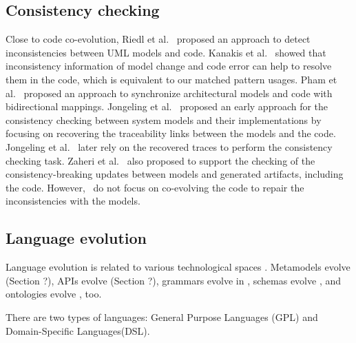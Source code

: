  \subsection{Consistency checking }
 \label{Consistency_checking}
  Close to code co-evolution, Riedl et al.~\cite{riedl2014towards} proposed an approach to detect inconsistencies between UML models and code. Kanakis et al.~\cite{kanakis2019empirical} showed that inconsistency information of model change and code error can help to resolve them in the code, which is equivalent to our matched pattern usages. 
 Pham et al.~\cite{pham2017bidirectional} proposed an approach to synchronize architectural models and code with bidirectional mappings.
 Jongeling et al.~\cite{jongeling2020towards} proposed an early approach for the consistency checking between system models and their implementations by focusing on recovering the traceability links between the models and the code. Jongeling et al.~\cite{jongeling2022Structural} later rely on the recovered traces to perform the consistency checking task.  %
 Zaheri et al.~\cite{zaheri2021towards} also proposed to support the checking of the consistency-breaking updates between models and generated artifacts, including the code. However,~\cite{pham2017bidirectional,jongeling2020towards,jongeling2022Structural,zaheri2021towards} do not focus on co-evolving the code to repair the inconsistencies with the models. 
 \subsection{Language evolution}
 
Language evolution is related to  various technological spaces \cite{ivanov2002technological}. Metamodels evolve \cite{favre2003meta} (Section ?), APIs evolve \cite{dig2006apis}(Section ?), grammars evolve in \cite{5279907}, schemas evolve  \cite{lammel2001format,meyer1996schema}, and ontologies evolve \cite{flouris2008ontology}, too.
  
   There are two types of languages: General Purpose Languages (GPL) and Domain-Specific Languages(DSL). 
   
